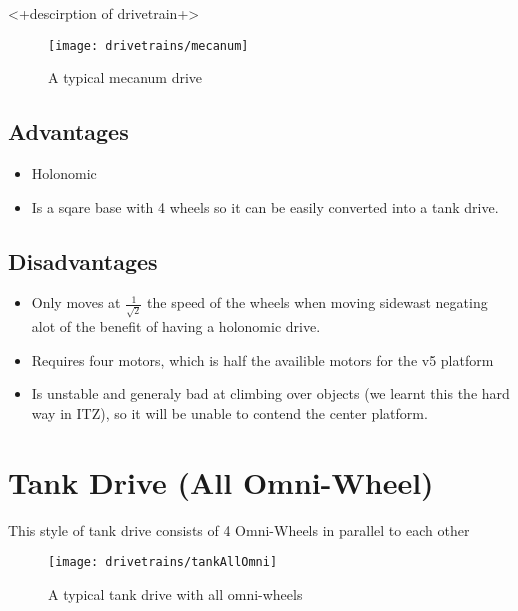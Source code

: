 \documentclass[../../main.tex]{subfiles}
\begin{document}
<+descirption of drivetrain+>

\begin{figure}[h]
	\centering

	\texttt{[image: drivetrains/mecanum]}
	\caption{A typical mecanum drive}
	\label{fig:drivetrainMecanum}
\end{figure}

\subsection{Advantages}

\begin{itemize}
	\item Holonomic
	\item Is a sqare base with 4 wheels so it can be easily converted
	      into a tank drive.
\end{itemize}

\subsection{Disadvantages}

\begin{itemize}
	\item Only moves at $\frac{1}{\sqrt{2}}$ the speed of the wheels when
	      moving sidewast
	      negating alot of the benefit of having a holonomic drive.
	\item Requires four motors, which is half the availible motors for the
	      v5 platform
	\item Is unstable and generaly bad at climbing over objects (we learnt
	      this the hard
	      way in ITZ), so it will be unable to contend the center platform.
\end{itemize}

\section{Tank Drive (All Omni-Wheel)}

This style of tank drive consists of 4 Omni-Wheels in parallel to each other

\begin{figure}[h] \centering

	\texttt{[image: drivetrains/tankAllOmni]} \caption{A typical tank drive with all omni-wheels} \label{fig:drivetrainTankAllOmni} \end{figure}
\end{document}
